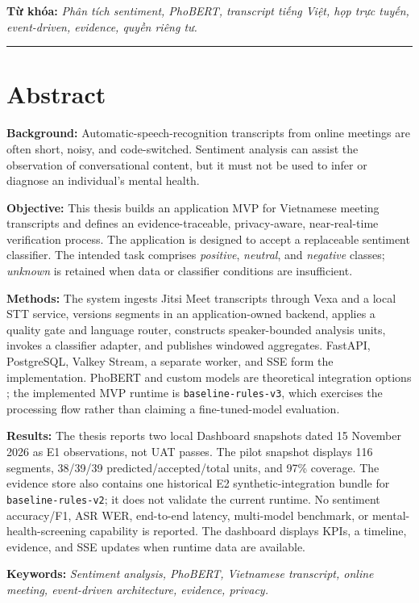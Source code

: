 \vspace{0.5cm}
\textbf{Từ khóa:} \textit{Phân tích sentiment, PhoBERT, transcript tiếng Việt, họp trực tuyến, event-driven, evidence, quyền riêng tư.}

\vspace{1cm}
\hrule
\vspace{0.5cm}

\chapter*{Abstract}

\textbf{Background:} Automatic-speech-recognition transcripts from online meetings are often short, noisy, and code-switched. Sentiment analysis can assist the observation of conversational content, but it must not be used to infer or diagnose an individual's mental health.

\textbf{Objective:} This thesis builds an application MVP for Vietnamese meeting transcripts and defines an evidence-traceable, privacy-aware, near-real-time verification process. The application is designed to accept a replaceable sentiment classifier. The intended task comprises \textit{positive}, \textit{neutral}, and \textit{negative} classes; \textit{unknown} is retained when data or classifier conditions are insufficient.

\textbf{Methods:} The system ingests Jitsi Meet transcripts through Vexa and a local STT service, versions segments in an application-owned backend, applies a quality gate and language router, constructs speaker-bounded analysis units, invokes a classifier adapter, and publishes windowed aggregates. FastAPI, PostgreSQL, Valkey Stream, a separate worker, and SSE form the implementation. PhoBERT and custom models are theoretical integration options \cite{phobert2020}; the implemented MVP runtime is \texttt{baseline-rules-v3}, which exercises the processing flow rather than claiming a fine-tuned-model evaluation.

\textbf{Results:} The thesis reports two local Dashboard snapshots dated 15 November 2026 as E1 observations, not UAT passes. The pilot snapshot displays 116 segments, 38/39/39 predicted/accepted/total units, and 97\% coverage. The evidence store also contains one historical E2 synthetic-integration bundle for \texttt{baseline-rules-v2}; it does not validate the current runtime. No sentiment accuracy/F1, ASR WER, end-to-end latency, multi-model benchmark, or mental-health-screening capability is reported. The dashboard displays KPIs, a timeline, evidence, and SSE updates when runtime data are available.

\textbf{Keywords:} \textit{Sentiment analysis, PhoBERT, Vietnamese transcript, online meeting, event-driven architecture, evidence, privacy.}

\cleardoublepage
